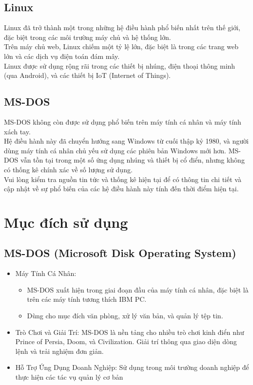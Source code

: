\documentclass[12pt,a4paper]{article}
\begin{document}
\subsection{Linux}
Linux đã trở thành một trong những hệ điều hành phổ biến nhất trên thế giới, đặc biệt trong các môi trường máy chủ và hệ thống lớn.\\

Trên máy chủ web, Linux chiếm một tỷ lệ lớn, đặc biệt là trong các trang web lớn và các dịch vụ điện toán đám mây.\\

Linux được sử dụng rộng rãi trong các thiết bị nhúng, điện thoại thông minh (qua Android), và các thiết bị IoT (Internet of Things).\\
\subsection{MS-DOS}
MS-DOS không còn được sử dụng phổ biến trên máy tính cá nhân và máy tính xách tay.\\

Hệ điều hành này đã chuyển hướng sang Windows từ cuối thập kỷ 1980, và người dùng máy tính cá nhân chủ yếu sử dụng các phiên bản Windows mới hơn.
MS-DOS vẫn tồn tại trong một số ứng dụng nhúng và thiết bị cổ điển, nhưng không có thống kê chính xác về số lượng sử dụng.\\

Vui lòng kiểm tra nguồn tin tức và thống kê hiện tại để có thông tin chi tiết và cập nhật về sự phổ biến của các hệ điều hành này tính đến thời điểm hiện tại.

\section{Mục đích sử dụng}
\subsection{MS-DOS (Microsoft Disk Operating System)}
\begin{itemize}
	\item Máy Tính Cá Nhân:
	\begin{itemize}
		\item MS-DOS xuất hiện trong giai đoạn đầu của máy tính cá nhân, đặc biệt là trên các máy tính tương thích IBM PC.
		\item Dùng cho mục đích văn phòng, xử lý văn bản, và quản lý tệp tin.
	\end{itemize}
	\item Trò Chơi và Giải Trí: MS-DOS là nền tảng cho nhiều trò chơi kinh điển như Prince of Persia, Doom, và Civilization. Giải trí thông qua giao diện dòng lệnh và trải nghiệm đơn giản.
	\item Hỗ Trợ Ứng Dụng Doanh Nghiệp: Sử dụng trong môi trường doanh nghiệp để thực hiện các tác vụ quản lý cơ bản
\end{itemize}
\end{document}
